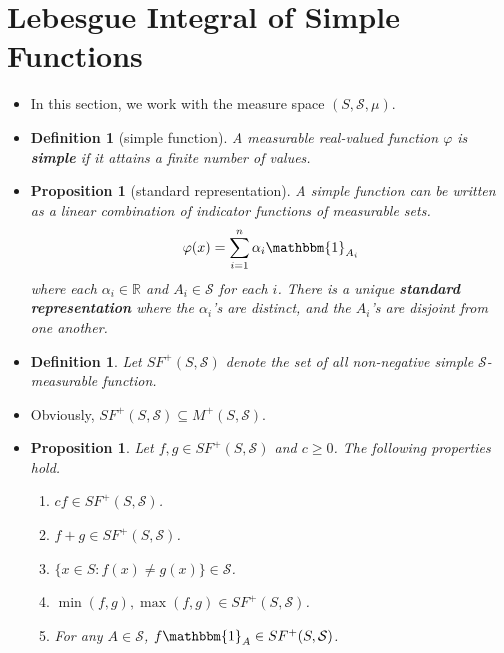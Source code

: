 \documentclass[10pt]{article}
\newtheorem{definition}[lemma]{Definition}
\newtheorem{proposition}[lemma]{Proposition}
\numberwithin{lemma}{section}
\newcommand{\mcal}[1]{\mathcal{#1}}
\newcommand{\Real}{\mathbb{R}}
\begin{document}
\section{Lebesgue Integral of Simple Functions}

\begin{itemize}
  \item In this section, we work with the measure space $(S, \mcal{S}, \mu)$.
  
  \item \begin{definition}[simple function]
    A measurable real-valued function $\varphi$ is {\bf simple} if it attains a finite number of values.
  \end{definition}

  \item \begin{proposition}[standard representation] A simple function can be written as a linear combination of indicator functions of measurable sets.
  \begin{align*}
    \varphi(x) = \sum_{i=1}^n \alpha_i \mathbbm{1}_{A_i}
  \end{align*}
  where each $\alpha_i \in \Real$ and $A_i \in \mcal{S}$ for each $i$. There is a unique {\bf standard representation} where the $\alpha_i$'s are distinct, and the $A_i$'s are disjoint from one another.
  \end{proposition}

  \item \begin{definition}
    Let $SF^+(S,\mcal{S})$ denote the set of all non-negative simple $\mcal{S}$-measurable function.
  \end{definition}
  
  \item Obviously, $SF^+(S,\mcal{S}) \subseteq M^+(S,\mcal{S})$.

  \item \begin{proposition}
    Let $f,g \in SF^+(S,\mcal{S})$ and $c \geq 0$. The following properties hold.
    \begin{enumerate}
      \item $cf \in SF^+(S,\mcal{S})$.
      \item $f+g \in SF^+(S,\mcal{S})$.
      \item $\{ x \in S : f(x) \neq g(x) \} \in \mcal{S}$.
      \item $\min(f,g), \max(f,g) \in SF^+(S,\mcal{S})$.
      \item For any $A \in \mcal{S}$, $f \mathbbm{1}_A \in SF^+(S,\mcal{S})$.
    \end{enumerate}
  \end{proposition}


\end{itemize}
\end{document}
